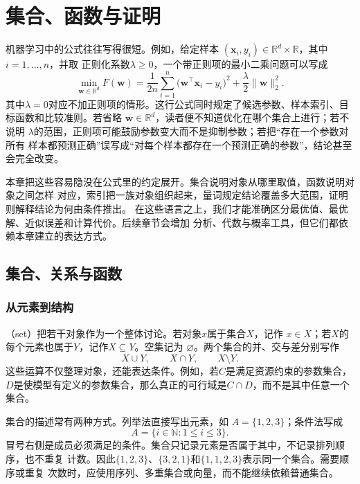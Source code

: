 \chapter{集合、函数与证明}
\label{chap:sets-functions-and-proofs}

机器学习中的公式往往写得很短。例如，给定样本
$(\bm{x}_i,y_i)\in\mathbb{R}^d\times\mathbb{R}$，其中$i=1,\ldots,n$，并取
正则化系数$\lambda\geq0$，一个带正则项的最小二乘问题可以写成
\begin{equation}
  \min_{\bm{w}\in\mathbb{R}^d}
  F(\bm{w})
  =
  \frac{1}{2n}\sum_{i=1}^{n}
  \bigl(\bm{w}^{\top}\bm{x}_i-y_i\bigr)^2
  +
  \frac{\lambda}{2}\lVert\bm{w}\rVert_2^2.
  \label{eq:prelim-regularized-least-squares}
\end{equation}
其中$\lambda=0$对应不加正则项的情形。这行公式同时规定了候选参数、样本索引、目标函数和比较准则。若省略
$\bm{w}\in\mathbb{R}^d$，读者便不知道优化在哪个集合上进行；若不说明
$\lambda$的范围，正则项可能鼓励参数变大而不是抑制参数；若把“存在一个参数对所有
样本都预测正确”误写成“对每个样本都存在一个预测正确的参数”，结论甚至会完全改变。

本章把这些容易隐没在公式里的约定展开。集合说明对象从哪里取值，函数说明对象之间怎样
对应，索引把一族对象组织起来，量词规定结论覆盖多大范围，证明则解释结论为何由条件推出。
在这些语言之上，我们才能准确区分最优值、最优解、近似误差和计算代价。后续章节会增加
分析、代数与概率工具，但它们都依赖本章建立的表达方式。

\section{集合、关系与函数}
\label{sec:prelim-sets-relations-functions}

\subsection{从元素到结构}

（set）把若干对象作为一个整体讨论。若对象$x$属于集合$X$，记作
$x\in X$；若$X$的每个元素也属于$Y$，记作$X\subseteq Y$。空集记为
$\varnothing$。两个集合的并、交与差分别写作
\[
  X\cup Y,\qquad X\cap Y,\qquad X\setminus Y.
\]
这些运算不仅整理对象，还能表达条件。例如，若$C$是满足资源约束的参数集合，
$D$是使模型有定义的参数集合，那么真正的可行域是$C\cap D$，而不是其中任意一个集合。

集合的描述常有两种方式。列举法直接写出元素，如
$A=\{1,2,3\}$；条件法写成
\[
  A=\{i\in\mathbb{N}:1\leq i\leq 3\}.
\]
冒号右侧是成员必须满足的条件。集合只记录元素是否属于其中，不记录排列顺序，也不重复
计数。因此$\{1,2,3\}$、$\{3,2,1\}$和$\{1,1,2,3\}$表示同一个集合。需要顺序或重复
次数时，应使用序列、多重集合或向量，而不能继续依赖普通集合。

